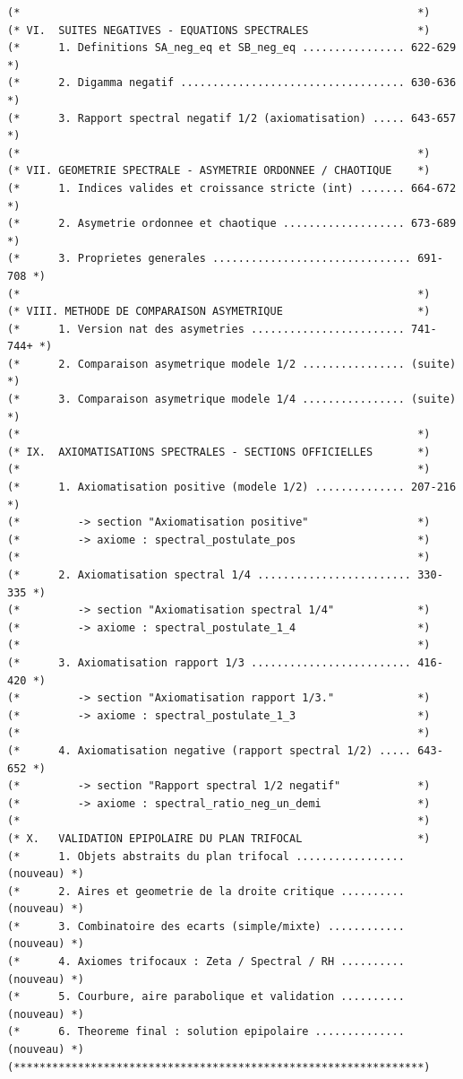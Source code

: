 \documentclass[a4paper,11pt]{article}
\begin{document}
\begin{holcode}[title={\textcolor{white}{File: methode\_spectral.thy -- Part 1/4}}]
\begin{lstlisting}
(*                                                              *)
(* VI.  SUITES NEGATIVES - EQUATIONS SPECTRALES                 *)
(*      1. Definitions SA_neg_eq et SB_neg_eq ................ 622-629 *)
(*      2. Digamma negatif ................................... 630-636 *)
(*      3. Rapport spectral negatif 1/2 (axiomatisation) ..... 643-657 *)
(*                                                              *)
(* VII. GEOMETRIE SPECTRALE - ASYMETRIE ORDONNEE / CHAOTIQUE    *)
(*      1. Indices valides et croissance stricte (int) ....... 664-672 *)
(*      2. Asymetrie ordonnee et chaotique ................... 673-689 *)
(*      3. Proprietes generales ............................... 691-708 *)
(*                                                              *)
(* VIII. METHODE DE COMPARAISON ASYMETRIQUE                     *)
(*      1. Version nat des asymetries ........................ 741-744+ *)
(*      2. Comparaison asymetrique modele 1/2 ................ (suite) *)
(*      3. Comparaison asymetrique modele 1/4 ................ (suite) *)
(*                                                              *)
(* IX.  AXIOMATISATIONS SPECTRALES - SECTIONS OFFICIELLES       *)
(*                                                              *)
(*      1. Axiomatisation positive (modele 1/2) .............. 207-216 *)
(*         -> section "Axiomatisation positive"                 *)
(*         -> axiome : spectral_postulate_pos                   *)
(*                                                              *)
(*      2. Axiomatisation spectral 1/4 ........................ 330-335 *)
(*         -> section "Axiomatisation spectral 1/4"             *)
(*         -> axiome : spectral_postulate_1_4                   *)
(*                                                              *)
(*      3. Axiomatisation rapport 1/3 ......................... 416-420 *)
(*         -> section "Axiomatisation rapport 1/3."             *)
(*         -> axiome : spectral_postulate_1_3                   *)
(*                                                              *)
(*      4. Axiomatisation negative (rapport spectral 1/2) ..... 643-652 *)
(*         -> section "Rapport spectral 1/2 negatif"            *)
(*         -> axiome : spectral_ratio_neg_un_demi               *)
(*                                                              *)
(* X.   VALIDATION EPIPOLAIRE DU PLAN TRIFOCAL                  *)
(*      1. Objets abstraits du plan trifocal ................. (nouveau) *)
(*      2. Aires et geometrie de la droite critique .......... (nouveau) *)
(*      3. Combinatoire des ecarts (simple/mixte) ............ (nouveau) *)
(*      4. Axiomes trifocaux : Zeta / Spectral / RH .......... (nouveau) *)
(*      5. Courbure, aire parabolique et validation .......... (nouveau) *)
(*      6. Theoreme final : solution epipolaire .............. (nouveau) *)
(****************************************************************)


\end{lstlisting}
\end{holcode}
\end{document}
